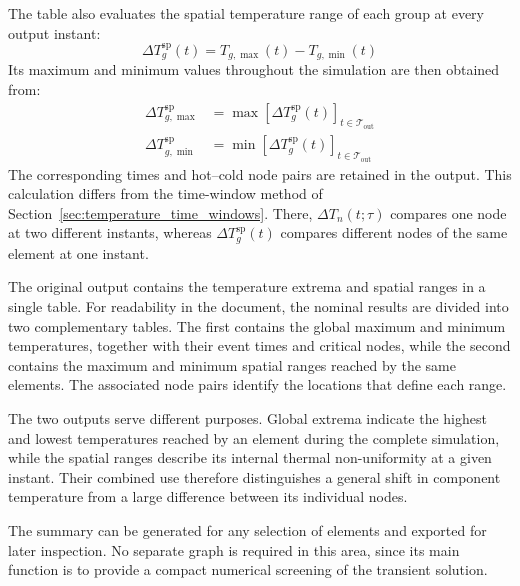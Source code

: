 The table also evaluates the spatial temperature range of each group at every
output instant:
\begin{equation}
    \Delta T_g^{\mathrm{sp}}(t)
    =
    T_{g,\max}(t)-T_{g,\min}(t)
    \label{eq:summary_spatial_delta_t}
\end{equation}
Its maximum and minimum values throughout the simulation are then obtained
from:
\begin{align}
    \Delta T_{g,\max}^{\mathrm{sp}}
    &=
    \max\!\left[
        \Delta T_g^{\mathrm{sp}}(t)
    \right]_{t\in\mathcal{T}_{\mathrm{out}}}
    \label{eq:summary_spatial_delta_t_max}
    \\
    \Delta T_{g,\min}^{\mathrm{sp}}
    &=
    \min\!\left[
        \Delta T_g^{\mathrm{sp}}(t)
    \right]_{t\in\mathcal{T}_{\mathrm{out}}}
    \label{eq:summary_spatial_delta_t_min}
\end{align}
The corresponding times and hot--cold node pairs are retained in the output.
This calculation differs from the time-window method of
Section~\ref{sec:temperature_time_windows}. There,
\(\Delta T_n(t;\tau)\) compares one node at two different instants, whereas
\(\Delta T_g^{\mathrm{sp}}(t)\) compares different nodes of the same element
at one instant.

The original output contains the temperature extrema and spatial ranges in a
single table. For readability in the document, the nominal results are
divided into two complementary tables. The first contains the global maximum
and minimum temperatures, together with their event times and critical nodes,
while the second contains the maximum and
minimum spatial ranges reached by the same elements. The associated node pairs
identify the locations that define each range.


\NominalThermalExtremaTable[0.7\textwidth]

\NominalThermalRangeTable[0.7\textwidth]

The two outputs serve different purposes. Global extrema indicate the highest
and lowest temperatures reached by an element during the complete simulation,
while the spatial ranges describe its internal thermal non-uniformity at a
given instant. Their combined use therefore distinguishes a general shift in
component temperature from a large difference between its individual nodes.

The summary can be generated for any selection of elements and exported for
later inspection. No separate graph is required in this area, since its main
function is to provide a compact numerical screening of the transient
solution.

